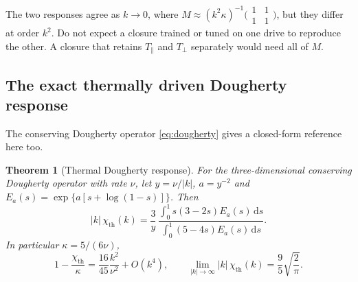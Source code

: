 \documentclass[11pt]{article}
\newcommand{\dd}{\,\mathrm d}
\newcommand{\kap}{\kappa}
\newcommand{\thr}{\mathrm{th}}
\newtheorem{theorem}{Theorem}[section]
\theoremstyle{definition}
\theoremstyle{remark}
\numberwithin{equation}{section}
\begin{document}
The two responses agree as $k\to0$, where
$M\approx(k^2\kap)^{-1}\bigl(\begin{smallmatrix}1&1\\1&1\end{smallmatrix}\bigr)$,
but they differ at order $k^2$. Do not expect a closure trained or tuned
on one drive to reproduce the other. A closure that retains
$T_\parallel$ and $T_\perp$ separately would need all of $M$.

\subsection{The exact thermally driven Dougherty response}\label{sec:th-dougherty}

The conserving Dougherty operator \eqref{eq:dougherty} gives a
closed-form reference here too.

\begin{theorem}[Thermal Dougherty response]\label{thm:th-dougherty}
For the three-dimensional conserving Dougherty operator with rate $\nu$,
let $y=\nu/|k|$, $a=y^{-2}$ and $E_a(s)=\exp\{a[s+\log(1-s)]\}$. Then
\begin{equation}
 |k|\,\chi_\thr(k)=\frac3y\,
 \frac{\int_0^1s(3-2s)E_a(s)\dd s}{\int_0^1(5-4s)E_a(s)\dd s} .
 \label{eq:th-dougherty}
\end{equation}
In particular $\kap=5/(6\nu)$,
\begin{equation}
 1-\frac{\chi_\thr}{\kap}=\frac{16}{45}\frac{k^2}{\nu^2}+O(k^4),
 \qquad
 \lim_{|k|\to\infty}|k|\,\chi_\thr(k)=\frac95\sqrt{\frac2\pi} .
 \label{eq:th-doughertylimits}
\end{equation}
\end{theorem}
\end{document}
